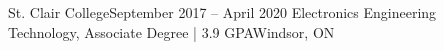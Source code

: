 \resumeSubheading
{St. Clair College}{September 2017 -- April 2020}
{Electronics Engineering Technology, Associate Degree | 3.9 GPA}{Windsor, ON}